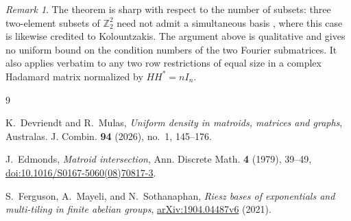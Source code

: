 \documentclass[11pt]{amsart}
\theoremstyle{remark}
\newtheorem{remark}[theorem]{Remark}
\begin{document}
\begin{remark}
The theorem is sharp with respect to the number of subsets:
three two-element subsets of $\mathbb Z_2^2$ need not admit a
simultaneous basis \cite[Example~7.2]{FMS}, where this case is
likewise credited to Kolountzakis. The argument above is
qualitative and gives no uniform bound on the condition numbers of
the two Fourier submatrices. It also applies verbatim to any two
row restrictions of equal size in a complex Hadamard matrix normalized
by $HH^*=nI_n$.
\end{remark}

\begin{thebibliography}{9}

K.~Devriendt and R.~Mulas,
\emph{Uniform density in matroids, matrices and graphs},
Australas. J. Combin. \textbf{94} (2026), no.~1, 145--176.

J.~Edmonds,
\emph{Matroid intersection},
Ann. Discrete Math. \textbf{4} (1979), 39--49,
\href{https://doi.org/10.1016/S0167-5060(08)70817-3}
{doi:10.1016/S0167-5060(08)70817-3}.

S.~Ferguson, A.~Mayeli, and N.~Sothanaphan,
\emph{Riesz bases of exponentials and multi-tiling in finite abelian
groups},
\href{https://arxiv.org/abs/1904.04487}
{arXiv:1904.04487v6} (2021).

\end{thebibliography}
\end{document}
